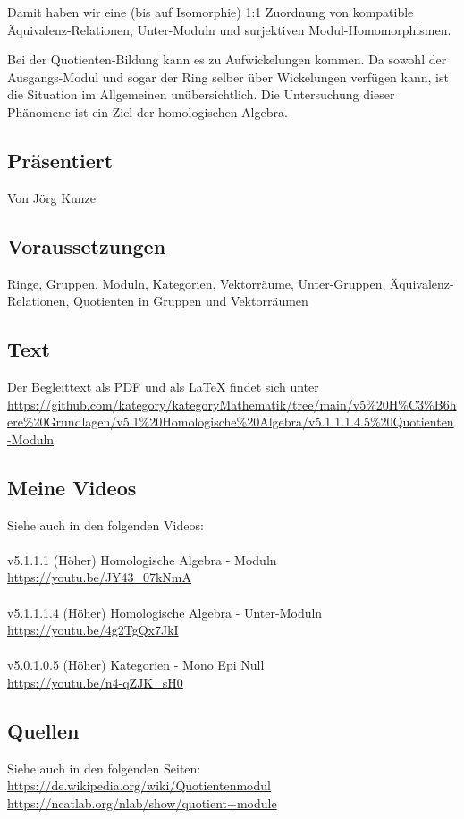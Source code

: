 \documentclass[a4paper]{amsart}
\theoremstyle{definition}
\begin{document}
Damit haben wir eine (bis auf Isomorphie) 1:1 Zuordnung von kompatible Äquivalenz-Relationen, Unter-Moduln und surjektiven Modul-Homomorphismen.

Bei der Quotienten-Bildung kann es zu Aufwickelungen kommen. Da sowohl der Ausgangs-Modul und sogar der Ring selber über Wickelungen verfügen kann, ist die Situation im Allgemeinen unübersichtlich. Die Untersuchung dieser Phänomene ist ein Ziel der homologischen Algebra.

\subsection*{Präsentiert}
Von Jörg Kunze

\subsection*{Voraussetzungen}
Ringe, Gruppen, Moduln, Kategorien, Vektorräume, Unter-Gruppen, Äquivalenz-Relationen, Quotienten in Gruppen und Vektorräumen

\subsection*{Text}
Der Begleittext als PDF und als LaTeX findet sich unter
{\tiny
   \url{https://github.com/kategory/kategoryMathematik/tree/main/v5%20H%C3%B6here%20Grundlagen/v5.1%20Homologische%20Algebra/v5.1.1.1.4.5%20Quotienten-Moduln}
}

\subsection*{Meine Videos}
Siehe auch in den folgenden Videos:\\
\\
v5.1.1.1 (Höher) Homologische Algebra - Moduln\\
\url{https://youtu.be/JY43_07kNmA}\\
\\
v5.1.1.1.4 (Höher) Homologische Algebra - Unter-Moduln\\
\url{https://youtu.be/4g2TgQx7JkI}\\
\\
v5.0.1.0.5 (Höher) Kategorien - Mono Epi Null\\
\url{https://youtu.be/n4-qZJK_sH0}

\subsection*{Quellen}
Siehe auch in den folgenden Seiten:\\
\url{https://de.wikipedia.org/wiki/Quotientenmodul}\\
\url{https://ncatlab.org/nlab/show/quotient+module}
\end{document}
